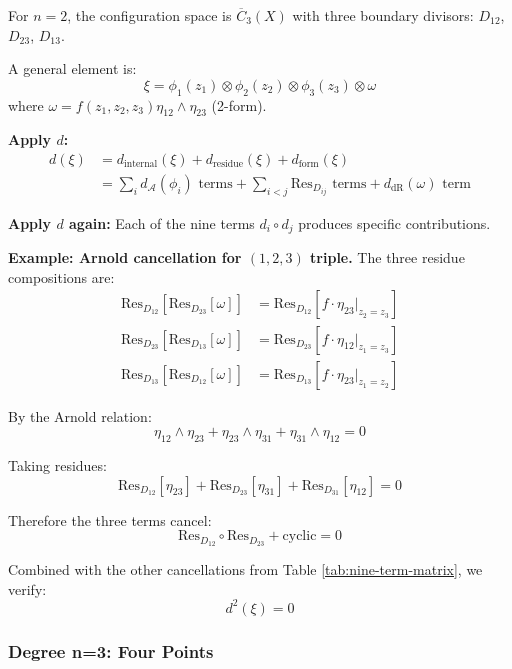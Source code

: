 \begin{computation}\label{comp:d-squared-deg2}
For $n=2$, the configuration space is $\overline{C}_3(X)$ with three boundary divisors:
$D_{12}$, $D_{23}$, $D_{13}$.

A general element is:
$$\xi = \phi_1(z_1) \otimes \phi_2(z_2) \otimes \phi_3(z_3) \otimes \omega$$
where $\omega = f(z_1, z_2, z_3) \eta_{12} \wedge \eta_{23}$ (2-form).

\textbf{Apply $d$:}
\begin{align*}
d(\xi) &= d_{\text{internal}}(\xi) + d_{\text{residue}}(\xi) + d_{\text{form}}(\xi)\\
&= \sum_i d_{\mathcal{A}}(\phi_i) \text{ terms} + \sum_{i<j} \text{Res}_{D_{ij}} \text{ terms}
+ d_{\text{dR}}(\omega) \text{ term}
\end{align*}

\textbf{Apply $d$ again:}
Each of the nine terms $d_i \circ d_j$ produces specific contributions.

\textbf{Example: Arnold cancellation for $(1,2,3)$ triple.}
The three residue compositions are:
\begin{align*}
\text{Res}_{D_{12}}[\text{Res}_{D_{23}}[\omega]] &= \text{Res}_{D_{12}}[f \cdot \eta_{23}|_{z_2=z_3}]\\
\text{Res}_{D_{23}}[\text{Res}_{D_{13}}[\omega]] &= \text{Res}_{D_{23}}[f \cdot \eta_{12}|_{z_1=z_3}]\\
\text{Res}_{D_{13}}[\text{Res}_{D_{12}}[\omega]] &= \text{Res}_{D_{13}}[f \cdot \eta_{23}|_{z_1=z_2}]
\end{align*}

By the Arnold relation:
$$\eta_{12} \wedge \eta_{23} + \eta_{23} \wedge \eta_{31} + \eta_{31} \wedge \eta_{12} = 0$$

Taking residues:
$$\text{Res}_{D_{12}}[\eta_{23}] + \text{Res}_{D_{23}}[\eta_{31}] + \text{Res}_{D_{31}}[\eta_{12}] = 0$$

Therefore the three terms cancel:
$$\text{Res}_{D_{12}} \circ \text{Res}_{D_{23}} + \text{cyclic} = 0$$

Combined with the other cancellations from Table \ref{tab:nine-term-matrix}, we verify:
$$d^2(\xi) = 0$$
\checkmark
\end{computation}

\subsubsection{Degree n=3: Four Points}

